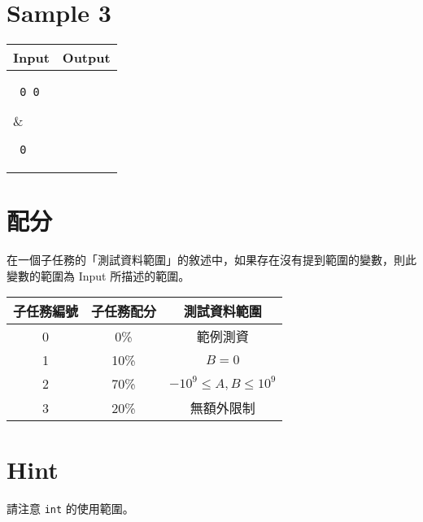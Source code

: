 \documentclass[11pt,a4paper]{article}
\begin{document}
\section*{Sample 3}
\begin{longtable}[!h]{|p{}|p{}|}
\hline
\textbf {Input}	& \textbf {Output} \\
\hline
\parbox[t]{0.5\textwidth} %
{ \tt
0 0 \\
} &
\parbox[t]{0.5\textwidth}
{ \tt
0 \\
} \\
\hline
\end{longtable}

\section*{配分}

在一個子任務的「測試資料範圍」的敘述中，如果存在沒有提到範圍的變數，則此變數的範圍為 Input 所描述的範圍。

\begin{center}
 \begin{tabular}{||c c c||} 
 \hline
 子任務編號 & 子任務配分 & 測試資料範圍 \\  
 \hline\hline
 0 & 0\% & 範例測資 \\ 
 \hline
 1 & 10\% & $B = 0$ \\
 \hline
 2 & 70\% & $-10^9 \le A, B \le 10^9$ \\
 \hline
 3 & 20\% & 無額外限制 \\
 \hline
\end{tabular}
\end{center}

\section*{Hint}
請注意 \texttt{int} 的使用範圍。
\end{document}
